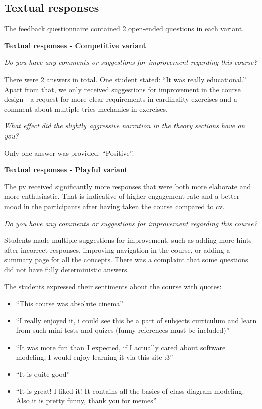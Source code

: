 \subsection{Textual responses \label{sec:text_feedback}}

The feedback questionnaire contained 2 open-ended questions in each variant.

\textbf{Textual responses - Competitive variant}

\textit{Do you have any comments or suggestions for improvement regarding this course?}

There were 2 answers in total. One student stated: \enquote{It was really educational.} Apart from that, we only received suggestions for improvement in the course design - a request for more clear requirements in cardinality exercises and a comment about multiple tries mechanics in exercises.

\textit{What effect did the slightly aggressive narration in the theory sections have on you?}

Only one answer was provided: \enquote{Positive}.

\textbf{Textual responses - Playful variant}

The \ac{pv} received significantly more responses that were both more elaborate and more enthusiastic. That is indicative of higher engagement rate and a better mood in the participants after having taken the course compared to \ac{cv}.

\textit{Do you have any comments or suggestions for improvement regarding this course?}

Students made multiple suggestions for improvement, such as adding more hints after incorrect responses, improving navigation in the course, or adding a summary page for all the concepts. There was a complaint that some questions did not have fully deterministic answers.

The students expressed their sentiments about the course with quotes:

\begin{itemize}
    \item \enquote{This course was absolute cinema}
    \item \enquote{I really enjoyed it, i could see this be a part of subjects curriculum and learn from such mini tests and quizes (funny references must be included)}
    \item \enquote{It was more fun than I expected, if I actually cared about software modeling, I would enjoy learning it via this site :3}
    \item \enquote{It is quite good}
    \item \enquote{It is great! I liked it! It contains all the basics of class diagram modeling. Also it is pretty funny, thank you for memes}
\end{itemize}


